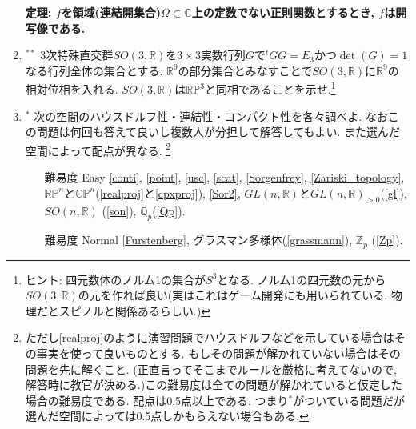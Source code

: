 \documentclass[dvipdfmx,a4paper,11pt]{article}
\newcommand{\R}{\mathbb{R}}
\newcommand{\Z}{\mathbb{Z}}
\newcommand{\Q}{\mathbb{Q}}
\newcommand{\C}{\mathbb{C}}
\theoremstyle{definition}
\begin{document}
\begin{enumerate}[label=\textbf{問}\ref*{sec-compact_continue}.\arabic*]
   \begin{tcolorbox}[
    colback = white,
    colframe = green!35!black,
    fonttitle = \bfseries,
    breakable = true]
 \bf{ 定理:}  $f$を領域(連結開集合)$\Omega \subset \C$上の定数でない正則関数とするとき, $f$は開写像である.
 \end{tcolorbox}



\item \label{so3} $^{**}$ 3次特殊直交群$SO(3,\R)$を$ 3\times 3$実数行列$G$で$^{t}GG=E_3$かつ$\det(G)=1$なる行列全体の集合とする. $\R^{9}$の部分集合とみなすことで$SO(3,\R)$に$\R^{9}$の相対位相を入れる. 
$SO(3,\R)$は$\R\mathbb{P}^{3}$と同相であることを示せ.\footnote{ヒント: 四元数体のノルム1の集合が$S^3$となる. ノルム1の四元数の元から$SO(3,\R)$の元を作れば良い(実はこれはゲーム開発にも用いられている. 物理だとスピノルと関係あるらしい.)}




\item$^{*}$ \label{HCC}次の空間のハウスドルフ性・連結性・コンパクト性を各々調べよ. なおこの問題は何回も答えて良いし複数人が分担して解答してもよい. また選んだ空間によって配点が異なる. 
\footnote{ただし\ref{realproj}のように演習問題でハウスドルフなどを示している場合はその事実を使って良いものとする. もしその問題が解かれていない場合はその問題を先に解くこと. (正直言ってそこまでルールを厳格に考えてないので, 解答時に教官が決める.)この難易度は全ての問題が解かれていると仮定した場合の難易度である. 配点は0.5点以上である. つまり$^{*}$がついている問題だが選んだ空間によっては0.5点しかもらえない場合もある.} 
\begin{itemize}
\setlength{\parskip}{0cm} 
  \setlength{\itemsep}{0cm} 
\item[難易度 Easy] \ref{conti}, \ref{point}, \ref{usc}, \ref{scat}, \ref{Sorgenfrey}, \ref{Zariski_topology},
 $\R\mathbb{P}^n$と$\C\mathbb{P}^n$(\ref{realproj}と\ref{cpxproj}), \ref{Sor2}, $GL(n,\R)$と$GL(n,\R)_{>0}$(\ref{gl}), $SO(n,\R)$ (\ref{son}), $\Q_p$(\ref{Qp}).
\item[難易度 Normal]  \ref{Furstenberg}, グラスマン多様体(\ref{grassmann}), $\Z_p$ (\ref{Zp}).
\end{itemize}


\end{enumerate}
\end{document}
